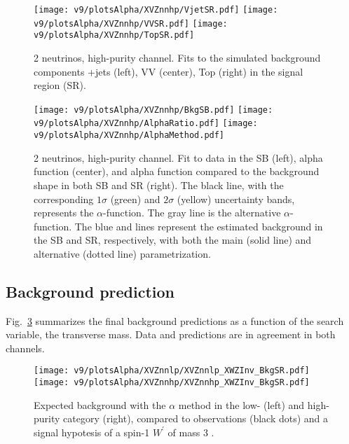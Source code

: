 \begin{figure}[!htb]
  \centering
    \texttt{[image: v9/plotsAlpha/XVZnnhp/VjetSR.pdf]}
    \texttt{[image: v9/plotsAlpha/XVZnnhp/VVSR.pdf]}
    \texttt{[image: v9/plotsAlpha/XVZnnhp/TopSR.pdf]}
    \caption{2 neutrinos, high-purity channel. Fits to the simulated background components \V+jets (left), VV (center), Top (right) in the signal region (SR).}
  \label{fig:XVZnnhp_SR}
\end{figure}

\begin{figure}[!htb]
  \centering
    \texttt{[image: v9/plotsAlpha/XVZnnhp/BkgSB.pdf]}
    \texttt{[image: v9/plotsAlpha/XVZnnhp/AlphaRatio.pdf]}
    \texttt{[image: v9/plotsAlpha/XVZnnhp/AlphaMethod.pdf]}
  \caption{2 neutrinos, high-purity channel. Fit to data in the SB (left), alpha function (center), and alpha function compared to the background shape in both SB and SR (right). The black line, with the corresponding $1\sigma$ (green) and $2\sigma$ (yellow) uncertainty bands, represents the $\alpha$-function. The gray line is the alternative $\alpha$-function. The blue and lines represent the estimated background in the SB and SR, respectively, with both the main (solid line) and alternative (dotted line) parametrization.}
  \label{fig:XVZnnhp_Alpha}
\end{figure}

\clearpage


\subsection{Background prediction}
Fig.~\ref{fig:XVZnn_Exp} summarizes the final background predictions as a function of the search variable, the transverse mass. Data and predictions are in agreement in both channels.

\begin{figure}[!htb]
  \centering
    \texttt{[image: v9/plotsAlpha/XVZnnlp/XVZnnlp\_XWZInv\_BkgSR.pdf]}
    \texttt{[image: v9/plotsAlpha/XVZnnhp/XVZnnhp\_XWZInv\_BkgSR.pdf]}
  \caption{Expected background with the $\alpha$ method in the low- (left) and high-purity category (right), compared to observations (black dots) and a signal hypotesis of a spin-1 $W^{'}$ of mass 3 \TeV.}
  \label{fig:XVZnn_Exp}
\end{figure}

\clearpage

